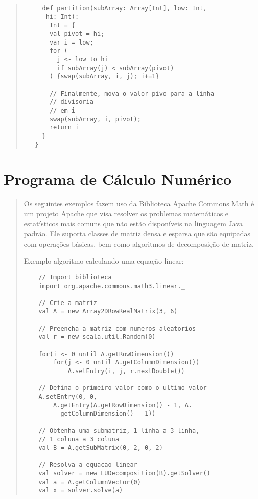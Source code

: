 \begin{quote}
\begin{lstlisting}
     def partition(subArray: Array[Int], low: Int,
      hi: Int):
       Int = {
       val pivot = hi;
       var i = low;
       for (
         j <- low to hi
         if subArray(j) < subArray(pivot)
       ) {swap(subArray, i, j); i+=1}

       // Finalmente, mova o valor pivo para a linha
       // divisoria
       // em i
       swap(subArray, i, pivot);
       return i
     }
   }

  \end{lstlisting}

\end{quote}

\section{Programa de C\'{a}lculo Num\'{e}rico}
\begin{quote}
  Os seguintes exemplos fazem uso da Biblioteca Apache Commons Math é um projeto
  Apache que visa resolver os problemas matemáticos e estatísticos mais comuns
  que não estão disponíveis na linguagem Java padrão. Ele suporta classes de matriz
  densa e esparsa que são equipadas com operações básicas, bem como algoritmos de
  decomposição de matriz. \cite{alexander2013scala}

  \hspace{2.5mm}Exemplo algoritmo calculando uma equação linear:

  \begin{lstlisting}
    // Import biblioteca
    import org.apache.commons.math3.linear._

    // Crie a matriz
    val A = new Array2DRowRealMatrix(3, 6)

    // Preencha a matriz com numeros aleatorios
    val r = new scala.util.Random(0)

    for(i <- 0 until A.getRowDimension())
        for(j <- 0 until A.getColumnDimension())
            A.setEntry(i, j, r.nextDouble())

    // Defina o primeiro valor como o ultimo valor
    A.setEntry(0, 0,
        A.getEntry(A.getRowDimension() - 1, A.
          getColumnDimension() - 1))

    // Obtenha uma submatriz, 1 linha a 3 linha,
    // 1 coluna a 3 coluna
    val B = A.getSubMatrix(0, 2, 0, 2)

    // Resolva a equacao linear
    val solver = new LUDecomposition(B).getSolver()
    val a = A.getColumnVector(0)
    val x = solver.solve(a)
   \end{lstlisting}
\end{quote}
